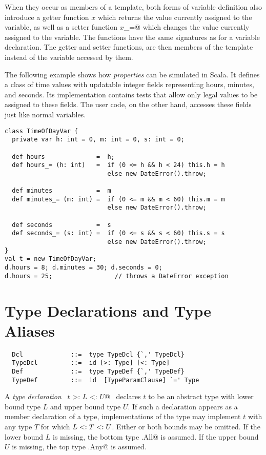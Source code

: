 \documentclass[a4paper,12pt,twoside,titlepage]{book}
\begin{document}
When they occur as members of a template, both forms of variable
definition also introduce a getter function $x$ which returns the
value currently assigned to the variable, as well as a setter function
\lstinline@$x$_=@ which changes the value currently assigned to the variable.
The functions have the same signatures as for a variable declaration.
The getter and setter functions, are then members of the template
instead of the variable accessed by them.

\example The following example shows how {\em properties} can be
simulated in Scala. It defines a class  of time
values with updatable integer fields representing hours, minutes, and
seconds. Its implementation contains tests that allow only legal
values to be assigned to these fields. The user code, on the other
hand, accesses these fields just like normal variables.

\begin{lstlisting}
class TimeOfDayVar {
  private var h: int = 0, m: int = 0, s: int = 0;

  def hours              =  h;
  def hours_= (h: int)   =  if (0 <= h && h < 24) this.h = h 
                            else new DateError().throw;

  def minutes            =  m
  def minutes_= (m: int) =  if (0 <= m && m < 60) this.m = m
                            else new DateError().throw;

  def seconds            =  s
  def seconds_= (s: int) =  if (0 <= s && s < 60) this.s = s
                            else new DateError().throw;
}
val t = new TimeOfDayVar;
d.hours = 8; d.minutes = 30; d.seconds = 0;
d.hours = 25;                 // throws a DateError exception
\end{lstlisting}

\section{Type Declarations and Type Aliases}
\label{sec:typedcl}
\label{sec:typealias}

\syntax\begin{lstlisting}
  Dcl             ::=  type TypeDcl {`,' TypeDcl}
  TypeDcl         ::=  id [>: Type] [<: Type]
  Def             ::=  type TypeDef {`,' TypeDef}
  TypeDef         ::=  id  [TypeParamClause] `=' Type
\end{lstlisting}

A {\em type declaration} ~\lstinline@type $t$ >: $L$ <: $U$@~ declares $t$ to
be an abstract type with lower bound type $L$ and upper bound
type $U$.  If such a declaration appears as a member declaration
of a type, implementations of the type may implement $t$ with any
type $T$ for which $L <: T <: U$. Either or both bounds may
be omitted.  If the lower bound $L$ is missing, the bottom type
\lstinline@scala.All@ is assumed.  If the upper bound $U$ is missing,
the top type \lstinline@scala.Any@ is assumed.
\end{document}

